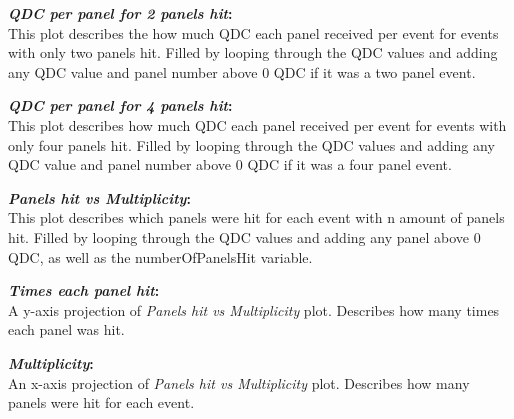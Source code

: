 \documentclass[a4paper,12pt]{article}
\begin{document}
\textbf{\emph{QDC per panel for 2 panels hit}:} \\
This plot describes the how much QDC each panel received per event for events with only two panels hit. Filled by looping through the QDC values and adding any QDC value and panel number above 0 QDC if it was a two panel event.

\textbf{\emph{QDC per panel for 4 panels hit}:} \\
This plot describes how much QDC each panel received per event for events with only four panels hit. Filled by looping through the QDC values and adding any QDC value and panel number above 0 QDC if it was a four panel event.

\pagebreak
\begin{figure}[h]
\centering
{}%
\end{figure}

\textbf{\emph{Panels hit vs Multiplicity}:} \\
This plot describes which panels were hit for each event with n amount of panels hit. Filled by looping through the QDC values and adding any panel above 0 QDC, as well as the numberOfPanelsHit variable.

\textbf{\emph{Times each panel hit}:} \\
A y-axis projection of \emph{Panels hit vs Multiplicity} plot. Describes how many times each panel was hit.

\textbf{\emph{Multiplicity}:} \\
An x-axis projection of \emph{Panels hit vs Multiplicity} plot. Describes how many panels were hit for each event.
\end{document}
